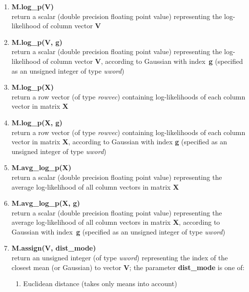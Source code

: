 \documentclass[10pt,a4paper]{article}
\begin{document}
\begin{small}
\begin{enumerate}[{$\bullet$}]
\itemsep 1ex

\item
{\bf M.log\_p(V)}\\
return a scalar (double precision floating point value) representing the log-likelihood of column vector {\bf V}

\item
{\bf M.log\_p(V, g)}\\
return a scalar (double precision floating point value) representing the log-likelihood of column vector {\bf V},
according to Gaussian with index~{\bf g} (specified as an unsigned integer of type {\it uword})

\item
{\bf M.log\_p(X)}\\
return a row vector (of type {\it rowvec}) containing log-likelihoods of each column vector in matrix {\bf X}


\item
{\bf M.log\_p(X, g)}\\
return a row vector (of type {\it rowvec}) containing log-likelihoods of each column vector in matrix {\bf X},
according to Gaussian with index {\bf g}  (specified as an unsigned integer of type {\it uword})

\item
{\bf M.avg\_log\_p(X)}\\
return a scalar (double precision floating point value) representing the average log-likelihood of all column vectors in matrix {\bf X}

\item
{\bf M.avg\_log\_p(X, g)}\\
return a scalar (double precision floating point value) representing the average log-likelihood of all column vectors in matrix {\bf X},
according to Gaussian with index~{\bf g}  (specified as an unsigned integer of type {\it uword})

\item
{\bf M.assign(V, dist\_mode)}\\
return an unsigned integer (of type {\it uword}) representing the index of the
closest mean (or Gaussian) to vector {\bf V}; the parameter {\bf dist\_mode} is one
of:
\begin{small}
\begin{enumerate}
\item
Euclidean distance (takes only means into account)
\end{enumerate}


\end{small}
\end{enumerate}
\end{small}
\end{document}
